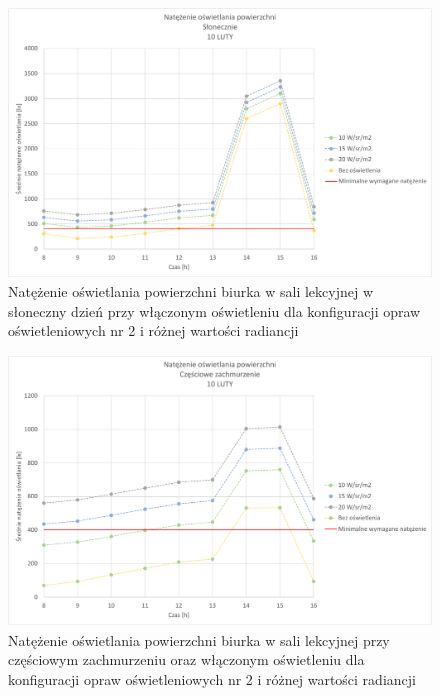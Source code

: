 \documentclass[a4paper,12pt]{article}
\begin{document}
	\begin{figure}[!ht]
		\centering
		\includegraphics[scale=0.8]{Wykresy/oswietlenie_2_slonecznie.pdf}
		\caption{Natężenie oświetlania powierzchni biurka w sali lekcyjnej w słoneczny dzień przy włączonym oświetleniu dla konfiguracji opraw oświetleniowych nr 2 i różnej wartości radiancji}
		\label{oswietlenie_2_slonecznie}
	\end{figure}
	
	\begin{figure}[!ht]
		\centering
		\includegraphics[scale=0.8]{Wykresy/oswietlenie_2_czesciowe_zachmurzenie.pdf}
		\caption{Natężenie oświetlania powierzchni biurka w sali lekcyjnej przy częściowym zachmurzeniu  oraz włączonym oświetleniu dla konfiguracji opraw oświetleniowych nr 2 i różnej wartości radiancji}
		\label{oswietlenie_2_czesciowe_zachmurzenie}
	\end{figure}
	
\end{document}
